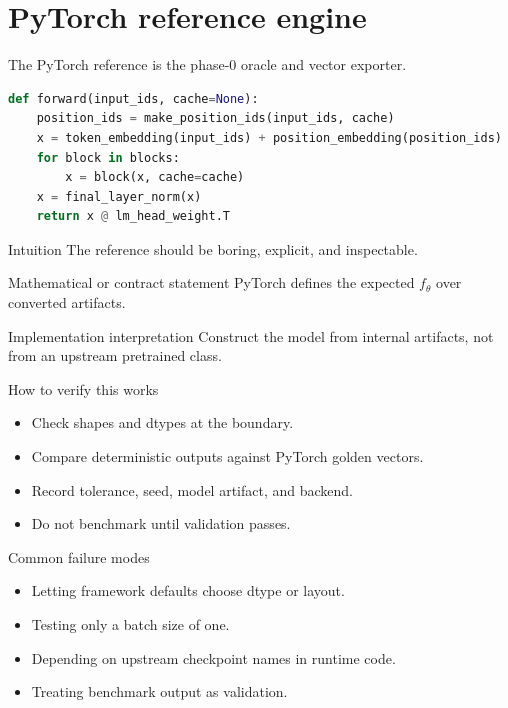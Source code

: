 \chapter{PyTorch reference engine}
\label{ch:pytorch-reference-engine}
The PyTorch reference is the phase-0 oracle and vector exporter. \citep{pytorchDocs}

\begin{lstlisting}[language=Python,caption={Reference-forward sketch.}]
def forward(input_ids, cache=None):
    position_ids = make_position_ids(input_ids, cache)
    x = token_embedding(input_ids) + position_embedding(position_ids)
    for block in blocks:
        x = block(x, cache=cache)
    x = final_layer_norm(x)
    return x @ lm_head_weight.T
\end{lstlisting}

\begin{intuitionbox}{Intuition}
The reference should be boring, explicit, and inspectable.
\end{intuitionbox}

\begin{definitionbox}{Mathematical or contract statement}
PyTorch defines the expected \(f_\theta\) over converted artifacts.
\end{definitionbox}

\begin{implementationbox}{Implementation interpretation}
Construct the model from internal artifacts, not from an upstream pretrained class.
\end{implementationbox}

\begin{verificationbox}{How to verify this works}
\begin{itemize}
\item Check shapes and dtypes at the boundary.
\item Compare deterministic outputs against PyTorch golden vectors.
\item Record tolerance, seed, model artifact, and backend.
\item Do not benchmark until validation passes.
\end{itemize}
\end{verificationbox}

\begin{warningbox}{Common failure modes}
\begin{itemize}
\item Letting framework defaults choose dtype or layout.
\item Testing only a batch size of one.
\item Depending on upstream checkpoint names in runtime code.
\item Treating benchmark output as validation.
\end{itemize}
\end{warningbox}

